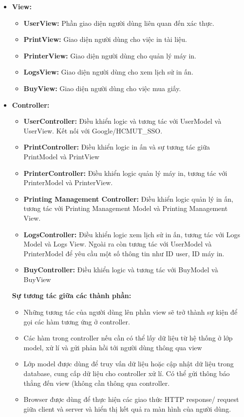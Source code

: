 \begin{itemize}
\begin{itemize}
    \end{itemize}
    \item \textbf{View:}
    \begin{itemize}
    \item \textbf{UserView:} Phần giao diện người dùng liên quan đến xác thực.
        \item \textbf{PrintView:} Giao diện người dùng cho việc in tài liệu.
        \item \textbf{PrinterView:} Giao diện người dùng cho quản lý máy in.
        \item \textbf{LogsView:} Giao diện người dùng cho xem lịch sử in ấn.
        \item \textbf{BuyView:} Giao diện người dùng cho việc mua giấy.
    \end{itemize}
    \item \textbf{Controller:}
    \begin{itemize}
    \item \textbf{UserController:} Điều khiển logic và tương tác với UserModel và UserView. Kết nối với Google/HCMUT\_SSO.
    \item \textbf{PrintController:} Điều khiển logic in ấn và sự tương tác giữa PrintModel và PrintView
        \item \textbf{PrinterController:} Điều khiển logic quản lý máy in, tương tác với PrinterModel và PrinterView.
        \item \textbf{Printing Management Controller:} Điều khiển logic quản lý in ấn, tương tác với Printing Management Model và Printing Management View.
        \item \textbf{LogsController:} Điều khiển logic xem lịch sử in ấn, tương tác với Logs Model và Logs View. Ngoài ra còn tương tác với UserModel và PrinterModel để yêu cầu một số thông tin như ID user, ID máy in.
        \item \textbf{BuyController:}  Điều khiển logic và tương tác với BuyModel và BuyView
    \end{itemize}
    \iten \textbf{Sự tương tác giữa các thành phần:}
    \begin{itemize}
        \item Những tương tác của người dùng lên phần view sẽ trở thành sự kiện để gọi các hàm tương ứng ở controller.
        \item  Các hàm trong controller nếu cần có thể lấy dữ liệu từ hệ thống ở lớp model, xử lí và gửi phản hồi tới người dùng thông qua view
        \item Lớp model được dùng để truy vấn dữ liệu hoặc cập nhật dữ liệu trong database, cung cấp dữ liệu cho controller xử lí. Có thể gửi thông báo thẳng đến view (không cần thông qua controller.
        \item Browser được dùng để thực hiện các giao thức HTTP response/ request giữa client và server và hiển thị kết quả ra màn hình của người dùng.
    \end{itemize}
\end{itemize}
